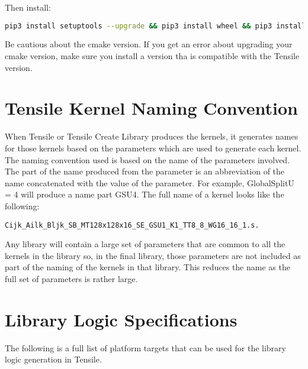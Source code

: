 \documentclass[]{article}
\begin{document}
\noindent Then install:

\begin{lstlisting}[language=bash,breaklines=true]
pip3 install setuptools --upgrade && pip3 install wheel && pip3 install pyyaml msgpack openpyxl pandas
\end{lstlisting}
\noindent Be cautious about the cmake version. If you get an error about upgrading your cmake version, make sure you install a version tha is compatible with the Tensile version.




\section{Tensile Kernel Naming Convention}
\label{sec:appendixC}

When Tensile or Tensile Create Library produces the kernels, it generates names for those kernels based on the parameters which are used to generate each kernel. The naming convention used is based on the name of the parameters involved. The part of the name produced from the parameter is an abbreviation of the name concatenated with the value of the parameter. For example, GlobalSplitU = 4 will produce a name part GSU4. The full name of a kernel looks like the following:

\begin{lstlisting}
Cijk_Ailk_Bljk_SB_MT128x128x16_SE_GSU1_K1_TT8_8_WG16_16_1.s.
\end{lstlisting}

Any library will contain a large set of parameters that are common to all the kernels in the library so, in the final library, those parameters are not included as part of the naming of the kernels in that library. This reduces the name as the full set of parameters is rather large.

\section{Library Logic Specifications}
\label{sec:appendixD}

The following is a full list of platform targets that can be used for the library logic generation in Tensile.
\end{document}

